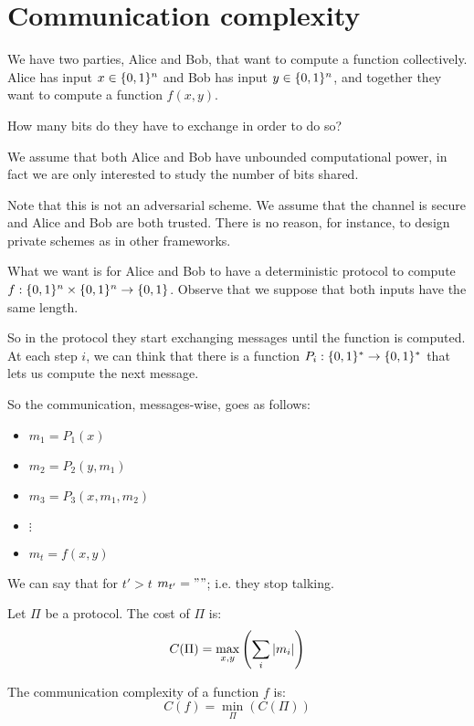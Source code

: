 \section{Communication complexity}\label{sec:comm_complexity}

We have two parties, Alice and Bob, that want to compute a function collectively.
Alice has input $x \in \{ 0,1 \}^n$ and Bob has input $y \in \{ 0,1 \}^n$, and together they want to compute a function $f(x,y)$.

How many bits do they have to exchange in order to do so?

We assume that both Alice and Bob have unbounded computational power, in fact we are only interested to study the number of bits shared.

Note that this is not an adversarial scheme. We assume that the channel is secure and Alice and Bob are both trusted.
There is no reason, for instance, to design private schemes as in other frameworks.

What we want is for Alice and Bob to have a deterministic protocol to compute $f : \{ 0,1 \}^n \times \{ 0,1 \}^n \rightarrow \{ 0,1 \}$.
Observe that we suppose that both inputs have the same length.

So in the protocol they start exchanging messages until the function is computed.
At each step $i$, we can think that there is a function $P_i : \{ 0,1 \}^* \rightarrow \{ 0,1 \}^*$ that lets us compute the next message.

So the communication, messages-wise, goes as follows:
\begin{itemize}
    \item $m_1 = P_1(x)$
    \item $m_2 = P_2(y, m_1)$
    \item $m_3 = P_3(x, m_1, m_2)$
    \item $\vdots$
    \item $m_t = f(x,y)$
\end{itemize}

We can say that for $t' > t$ $m_{t'} = ""$; i.e. they stop talking.

\begin{definition}\label{def:cost_protocol_communication}
    Let $\Pi$ be a protocol.
    The cost of $\Pi$ is:
    \[ C(\Pi) = \max_{x,y} \left( \sum_i \vert m_i \vert \right) \]
\end{definition}

\begin{definition}
    The communication complexity of a function $f$ is:
    \[ C(f) = \min_{\Pi} (C(\Pi)) \]
\end{definition}


